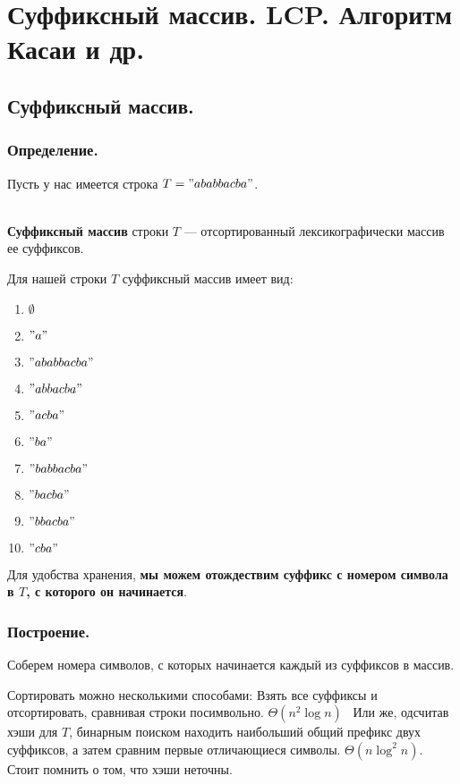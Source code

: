 \section{Суффиксный массив. LCP. Алгоритм Касаи и др.}
\subsection{Суффиксный массив.}

\subsubsection{Определение.}
Пусть у нас имеется строка $T = "ababbacba"$.
\begin{Def} \ \\
    \textbf{Суффиксный массив} строки $T$ --- отсортированный лексикографически массив ее суффиксов.
\end{Def}

\begin{example}
Для нашей строки $T$ суффиксный массив имеет вид:
\begin{enumerate}
    \item $\emptyset$
    \item $"a"$
    \item $"ababbacba"$
    \item $"abbacba"$
    \item $"acba"$
    \item $"ba"$
    \item $"babbacba"$
    \item $"bacba"$
    \item $"bbacba"$
    \item $"cba"$
\end{enumerate}
\end{example}

Для удобства хранения, \textbf{мы можем отождествим суффикс с номером символа в $T$, с которого он начинается}.

\subsubsection{Построение.}
Соберем номера символов, с которых начинается каждый из суффиксов в массив.

Сортировать можно несколькими способами:
Взять все суффиксы и отсортировать, сравнивая строки посимвольно. $\Theta(n ^ 2 \log n)$ \
Или же, одсчитав хэши для $T$, бинарным поиском находить наибольший общий префикс двух суффиксов, а затем сравним первые отличающиеся символы. $\Theta(n \log ^ 2 n)$. Стоит помнить о том, что хэши неточны.


